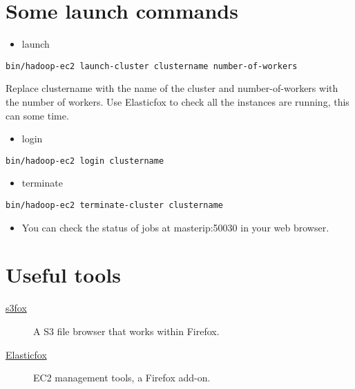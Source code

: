 \documentclass[letterpaper,10pt,english]{manual}
\begin{document}
\section{Some launch commands}
\begin{itemize}
\item {} 
launch

\end{itemize}

\begin{Verbatim}[commandchars=@\[\]]
bin/hadoop-ec2 launch-cluster clustername number-of-workers
\end{Verbatim}

Replace clustername with the name of the cluster and number-of-workers with the number of workers. Use Elasticfox to check all the instances are running, this can some time.
\begin{itemize}
\item {} 
login

\end{itemize}

\begin{Verbatim}[commandchars=@\[\]]
bin/hadoop-ec2 login clustername
\end{Verbatim}
\begin{itemize}
\item {} 
terminate

\end{itemize}

\begin{Verbatim}[commandchars=@\[\]]
bin/hadoop-ec2 terminate-cluster clustername
\end{Verbatim}
\begin{itemize}
\item {} 
You can check the status of jobs at masterip:50030 in your web browser.

\end{itemize}


\section{Useful tools}
\begin{description}
\item[\href{http://www.s3fox.net/}{s3fox}]
A S3 file browser that works within Firefox.

\item[\href{http://sourceforge.net/projects/elasticfox/}{Elasticfox}]
EC2 management tools, a Firefox add-on.

\end{description}
\end{document}
